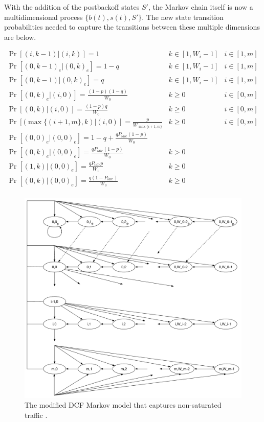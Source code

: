 \documentclass{llncs}
\begin{document}
With the addition of the postbackoff states $S'$, the Markov chain itself is now a multidimensional process $\{b(t), s(t), S' \}$. The new state transition probabilities needed to capture the transitions between these multiple dimensions are below.

\begin{center}
\begin{math}
\boxed{
\begin{array}{lll}
\Pr[(i,k-1) | (i, k)] = 1 & k \in [1, W_i-1] & i \in [1,m] \\
\Pr[(0,k-1)_e | (0, k)_e] = 1-q & k \in [1, W_i-1] & i \in [1,m] \\
\Pr[(0,k-1) | (0, k)_e] = q & k \in [1, W_i-1] & i \in [1,m] \\
\Pr[(0,k)_e | (i, 0)] = \frac{(1-p)(1-q)}{W_0} & k \geq 0 & i \in [0,m] \\
\Pr[(0,k) | (i, 0)] = \frac{(1-p)q}{W_0} & k \geq 0 & i \in [0,m] \\
\Pr[(\max\{(i+1,m\}, k) | (i, 0)] = \frac{p}{W_{\max\{i+1,m\}}} & k \geq 0 & i \in [0,m] \\
\Pr[(0,0)_e | (0, 0)_e] = 1 - q + \frac{qP_{idle}(1 - p)}{W_0} & ~ \\
\Pr[(0,k)_e | (0, 0)_e] = \frac{qP_{idle}(1 - p)}{W_0} & k > 0 \\
\Pr[(1,k) | (0, 0)_e] = \frac{qP_{idle}p}{W_1} & k \geq 0 \\
\Pr[(0,k) | (0, 0)_e] = \frac{q(1 - P_{idle})}{W_0} & k \geq 0 \\
\end{array}
}
\end{math}
\end{center}

\begin{figure}
\begin{center}
\includegraphics[scale=0.35]{../../sketches/dcf_model_nonsaturated.pdf}
\caption{The modified DCF Markov model that captures non-saturated traffic \cite{dcf-nonsaturated}.}
\label{fig:dcf_model_nonsaturated}
\end{center}
\end{figure}
\end{document}
